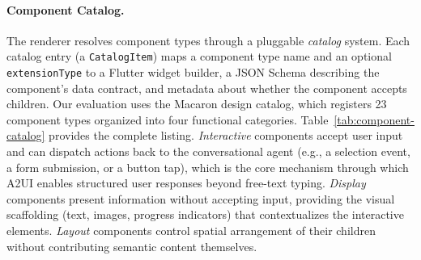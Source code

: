 \paragraph{Component Catalog.}
The renderer resolves component types through a pluggable \emph{catalog} system. Each catalog entry (a \texttt{CatalogItem}) maps a component type name and an optional \texttt{extensionType} to a Flutter widget builder, a JSON Schema describing the component's data contract, and metadata about whether the component accepts children. Our evaluation uses the Macaron design catalog, which registers 23 component types organized into four functional categories. Table~\ref{tab:component-catalog} provides the complete listing. \emph{Interactive} components accept user input and can dispatch actions back to the conversational agent (e.g., a selection event, a form submission, or a button tap), which is the core mechanism through which A2UI enables structured user responses beyond free-text typing. \emph{Display} components present information without accepting input, providing the visual scaffolding (text, images, progress indicators) that contextualizes the interactive elements. \emph{Layout} components control spatial arrangement of their children without contributing semantic content themselves.

